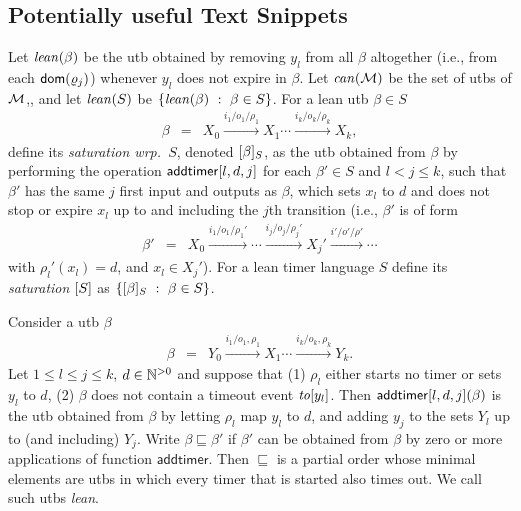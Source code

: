 \subsection{Potentially useful Text Snippets}


Let $\mathit{lean}({\beta})$ be the utb obtained by removing 
$y_l$ from all $\beta$ altogether (i.e., from each ${\textsf{dom}}(\varrho_j)$)
whenever $y_l$ does not expire in $\beta$.
Let $\mathit{can}({{\mathcal M}})$ be the set of utbs of ${\mathcal M}$,, and
let 
$\mathit{lean}({S})$ be $\lbrace \mathit{lean}({\beta}) ~:~ \beta \in S\rbrace$.
For a lean utb $\beta \in S$
\begin{eqnarray*}
\beta & = & X_0 \xrightarrow{i_1/o_1/\rho_1} X_1  \cdots \xrightarrow{i_k/o_k/\rho_k} X_{k},
\end{eqnarray*}
define its \emph{saturation wrp.\ $S$}, denoted $[\beta]_{S}$,
as the utb obtained from $\beta$ by performing the operation
$\mathsf{addtimer}[{l,d,j}]$ 
for each $\beta' \in S$ and $l < j \leq k$, such that $\beta'$ has the same
$j$ first input and outputs as $\beta$, which sets $x_l$ to $d$ and does not stop
or expire $x_l$ up to and including the $j$th transition (i.e., $\beta'$ is of
form
\begin{eqnarray*}
\beta' & = & X_0 \xrightarrow{i_1/o_1/\rho_1'} \cdots \xrightarrow{i_j/o_j/\rho_j'} X_{j}' \xrightarrow{i'/o'/\rho'}  \cdots
\end{eqnarray*}
with $\rho_l'(x_l) = d$, and $x_l \in X_j'$).
For a lean timer language $S$ define its \emph{saturation} $[S]$
as $\lbrace [\beta]_{S} ~:~ \beta \in S\rbrace$.

Consider a utb $\beta$
\begin{eqnarray*}
\beta & = & Y_0 \xrightarrow{i_1/o_1, \rho_1} X_1  \cdots \xrightarrow{i_k/o_k, \rho_k} Y_{k}.
\end{eqnarray*}
Let $1 \leq l \leq j \leq k$, $d \in {\mathbb N}^{>0}$ and suppose that 
(1) $\rho_l$ either starts no timer or sets $y_l$ to $d$,
(2) $\beta$ does not contain a timeout event $\mathit{to}[y_l]$.
Then $\mathsf{addtimer}[{l,d,j}]({\beta})$ is the utb obtained from $\beta$ by
letting $\rho_l$ map $y_l$ to $d$, and adding $y_j$ to the sets $Y_l$ up to (and including) $Y_j$.
Write $\beta \sqsubseteq \beta'$ if $\beta'$ can be obtained from $\beta$ by zero or more applications of function $\mathsf{addtimer}.$
Then $\sqsubseteq$ is a partial order whose minimal elements are utbs in which every timer that is started also times out.
We call such utbs \emph{lean}.


